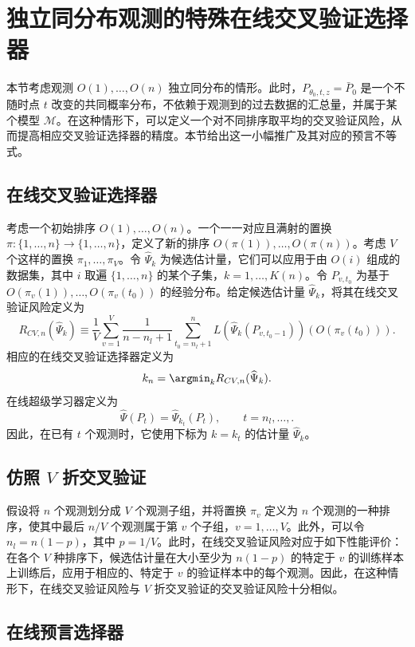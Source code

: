 \section{独立同分布观测的特殊在线交叉验证选择器}

本节考虑观测 $O(1),\ldots,O(n)$ 独立同分布的情形。此时，$P_{\theta_0,t,z}=\bar P_0$ 是一个不随时点 $t$ 改变的共同概率分布，不依赖于观测到的过去数据的汇总量，并属于某个模型 $\mathcal M$。在这种情形下，可以定义一个对不同排序取平均的交叉验证风险，从而提高相应交叉验证选择器的精度。本节给出这一小幅推广及其对应的预言不等式。

\subsection{在线交叉验证选择器}

考虑一个初始排序 $O(1),\ldots,O(n)$。一个一一对应且满射的置换 $\pi:\{1,\ldots,n\}\to\{1,\ldots,n\}$，定义了新的排序 $O(\pi(1)),\ldots,O(\pi(n))$。考虑 $V$ 个这样的置换 $\pi_1,\ldots,\pi_V$。令 $\widehat\Psi_k$ 为候选估计量，它们可以应用于由 $O(i)$ 组成的数据集，其中 $i$ 取遍 $\{1,\ldots,n\}$ 的某个子集，$k=1,\ldots,K(n)$。令 $P_{v,t_0}$ 为基于 $O(\pi_v(1)),\ldots,O(\pi_v(t_0))$ 的经验分布。给定候选估计量 $\widehat\Psi_k$，将其在线交叉验证风险定义为
\[
 R_{CV,n}(\widehat\Psi_k)
 \equiv\frac{1}{V}\sum_{v=1}^{V}\frac{1}{n-n_l+1}
 \sum_{t_0=n_l+1}^{n}
 L(\widehat\Psi_k(P_{v,t_0-1}))(O(\pi_v(t_0))).
\]
相应的在线交叉验证选择器定义为
\[
 k_n=\argmin_k R_{CV,n}(\widehat\Psi_k).
\]
在线超级学习器定义为
\[
 \widehat\Psi(P_t)=\widehat\Psi_{k_t}(P_t),\qquad t=n_l,\ldots,.
\]
因此，在已有 $t$ 个观测时，它使用下标为 $k=k_t$ 的估计量 $\widehat\Psi_k$。

\subsection{仿照 $V$ 折交叉验证}

假设将 $n$ 个观测划分成 $V$ 个观测子组，并将置换 $\pi_v$ 定义为 $n$ 个观测的一种排序，使其中最后 $n/V$ 个观测属于第 $v$ 个子组，$v=1,\ldots,V$。此外，可以令 $n_l=n(1-p)$，其中 $p=1/V$。此时，在线交叉验证风险对应于如下性能评价：在各个 $V$ 种排序下，候选估计量在大小至少为 $n(1-p)$ 的特定于 $v$ 的训练样本上训练后，应用于相应的、特定于 $v$ 的验证样本中的每个观测。因此，在这种情形下，在线交叉验证风险与 $V$ 折交叉验证的交叉验证风险十分相似。

\subsection{在线预言选择器}

